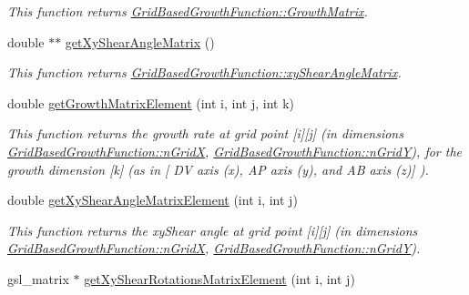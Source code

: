 \begin{DoxyCompactItemize}
\begin{DoxyCompactList}\small\item\em This function returns \hyperlink{classGridBasedGrowthFunction_a5522d9b84fa95ebd65cdf290a4f0a65c}{Grid\+Based\+Growth\+Function\+::\+Growth\+Matrix}. \end{DoxyCompactList}\item 
\hypertarget{classGridBasedGrowthFunction_ad590b4a5c6e5e47f5679de5a8c6cb738}{}double $\ast$$\ast$ \hyperlink{classGridBasedGrowthFunction_ad590b4a5c6e5e47f5679de5a8c6cb738}{get\+Xy\+Shear\+Angle\+Matrix} ()\label{classGridBasedGrowthFunction_ad590b4a5c6e5e47f5679de5a8c6cb738}

\begin{DoxyCompactList}\small\item\em This function returns \hyperlink{classGridBasedGrowthFunction_aa01cee8282299e18f27b47645da17438}{Grid\+Based\+Growth\+Function\+::xy\+Shear\+Angle\+Matrix}. \end{DoxyCompactList}\item 
\hypertarget{classGridBasedGrowthFunction_a1775fe1788bc97569c892d01cc625ea8}{}double \hyperlink{classGridBasedGrowthFunction_a1775fe1788bc97569c892d01cc625ea8}{get\+Growth\+Matrix\+Element} (int i, int j, int k)\label{classGridBasedGrowthFunction_a1775fe1788bc97569c892d01cc625ea8}

\begin{DoxyCompactList}\small\item\em This function returns the growth rate at grid point \mbox{[}i\mbox{]}\mbox{[}j\mbox{]} (in dimensions \hyperlink{classGridBasedGrowthFunction_af872b9963f3a579dcd615c23bcb58a86}{Grid\+Based\+Growth\+Function\+::n\+Grid\+X}, \hyperlink{classGridBasedGrowthFunction_a625bc963a1f1e7d1f1a35dbd0ef51728}{Grid\+Based\+Growth\+Function\+::n\+Grid\+Y}), for the growth dimension \mbox{[}k\mbox{]} (as in \mbox{[} D\+V axis (x), A\+P axis (y), and A\+B axis (z)\mbox{]} ). \end{DoxyCompactList}\item 
\hypertarget{classGridBasedGrowthFunction_a5075a53329b3a0b73a5864b7ffb37c5d}{}double \hyperlink{classGridBasedGrowthFunction_a5075a53329b3a0b73a5864b7ffb37c5d}{get\+Xy\+Shear\+Angle\+Matrix\+Element} (int i, int j)\label{classGridBasedGrowthFunction_a5075a53329b3a0b73a5864b7ffb37c5d}

\begin{DoxyCompactList}\small\item\em This function returns the xy\+Shear angle at grid point \mbox{[}i\mbox{]}\mbox{[}j\mbox{]} (in dimensions \hyperlink{classGridBasedGrowthFunction_af872b9963f3a579dcd615c23bcb58a86}{Grid\+Based\+Growth\+Function\+::n\+Grid\+X}, \hyperlink{classGridBasedGrowthFunction_a625bc963a1f1e7d1f1a35dbd0ef51728}{Grid\+Based\+Growth\+Function\+::n\+Grid\+Y}). \end{DoxyCompactList}\item 
\hypertarget{classGridBasedGrowthFunction_a85ed4f6a4b5165adf1ab8806b885f81a}{}gsl\+\_\+matrix $\ast$ \hyperlink{classGridBasedGrowthFunction_a85ed4f6a4b5165adf1ab8806b885f81a}{get\+Xy\+Shear\+Rotations\+Matrix\+Element} (int i, int j)\label{classGridBasedGrowthFunction_a85ed4f6a4b5165adf1ab8806b885f81a}


\end{DoxyCompactItemize}
